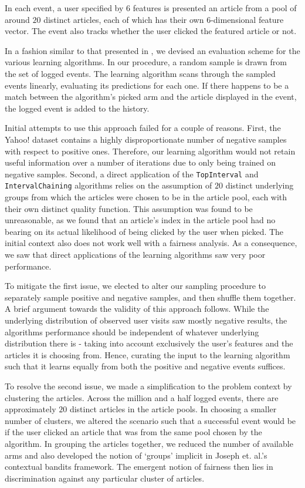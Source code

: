 \documentclass[11pt]{article}
\begin{document}
In each event, a user specified by $6$ features is presented an article from a pool of around $20$ distinct articles, each of which has their own $6$-dimensional feature vector. The event also tracks whether the user clicked the featured article or not.

In a fashion similar to that presented in \cite{DBLP:journals/corr/abs-1003-5956}, we devised an evaluation scheme for the various learning algorithms. In our procedure, a random sample is drawn from the set of logged events. The learning algorithm scans through the sampled events linearly, evaluating its predictions for each one. If there happens to be a match between the algorithm's picked arm and the article displayed in the event, the logged event is added to the history.

Initial attempts to use this approach failed for a couple of reasons. First, the Yahoo! dataset contains a highly disproportionate number of negative samples with respect to positive ones. Therefore, our learning algorithm would not retain useful information over a number of iterations due to only being trained on negative samples. Second, a direct application of the \texttt{TopInterval} and \texttt{IntervalChaining} algorithms relies on the assumption of $20$ distinct underlying groups from which the articles were chosen to be in the article pool, each with their own distinct quality function. This assumption was found to be unreasonable, as we found that an article's index in the article pool had no bearing on its actual likelihood of being clicked by the user when picked. The initial context also does not work well with a fairness analysis. As a consequence, we saw that direct applications of the learning algorithms saw very poor performance.

To mitigate the first issue, we elected to alter our sampling procedure to separately sample positive and negative samples, and then shuffle them together. A brief argument towards the validity of this approach follows. While the underlying distribution of observed user visits saw mostly negative results, the algorithms performance should be independent of whatever underlying distribution there is - taking into account exclusively the user's features and the articles it is choosing from. Hence, curating the input to the learning algorithm such that it learns equally from both the positive and negative events suffices.

To resolve the second issue, we made a simplification to the problem context by clustering the articles. Across the million and a half logged events, there are approximately $20$ distinct articles in the article pools. In choosing a smaller number of clusters, we altered the scenario such that a successful event would be if the user clicked an article that was from the same pool chosen by the algorithm. In grouping the articles together, we reduced the number of available arms and also developed the notion of `groups' implicit in Joseph et. al.'s contextual bandits framework. The emergent notion of fairness then lies in discrimination against any particular cluster of articles.
\end{document}
